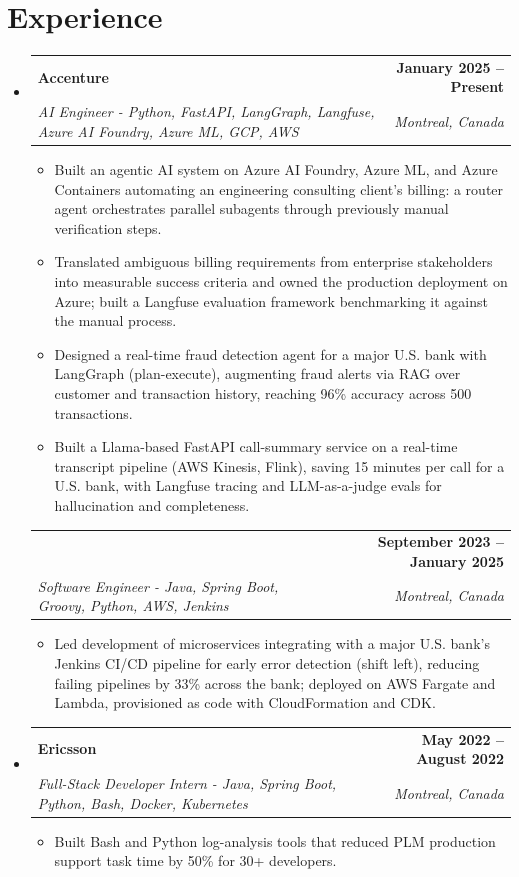 \documentclass[letterpaper,11pt]{article}
\makeatletter
\newcommand{\resumeItem}[1]{
  \item\small{{#1 \vspace{-2pt}}}
}
\newcommand{\resumeSubheading}[4]{
  \vspace{-2pt}\item
    \begin{tabular*}{1.0\textwidth}[t]{l@{\extracolsep{\fill}}r}
      \textbf{#1} & \textbf{\small #2} \\
      \textit{\small#3} & \textit{\small #4} \\
    \end{tabular*}\vspace{-7pt}
}
\newcommand{\resumeSubheadingContinued}[3]{
  \vspace{4pt}
    \begin{tabular*}{1.0\textwidth}[t]{l@{\extracolsep{\fill}}r}
      & \textbf{\small #2} \\
      \textit{\small#1} & \textit{\small #3} \\
    \end{tabular*}\vspace{-7pt}
}
\newcommand{\resumeSubHeadingListStart}{\begin{itemize}[leftmargin=0.0in, label={}]}
\newcommand{\resumeSubHeadingListEnd}{\end{itemize}}
\newcommand{\resumeItemListStart}{\begin{itemize}}
\newcommand{\resumeItemListEnd}{\end{itemize}\vspace{-5pt}}
\makeatother
\begin{document}
\section{Experience}
  \resumeSubHeadingListStart

    \resumeSubheading
      {Accenture}{January 2025 -- Present}
      {AI Engineer - Python, FastAPI, LangGraph, Langfuse, Azure AI Foundry, Azure ML, GCP, AWS}{Montreal, Canada}
      \resumeItemListStart
        \resumeItem{Built an agentic AI system on Azure AI Foundry, Azure ML, and Azure Containers automating an engineering consulting client's billing: a router agent orchestrates parallel subagents through previously manual verification steps.}
        \resumeItem{Translated ambiguous billing requirements from enterprise stakeholders into measurable success criteria and owned the production deployment on Azure; built a Langfuse evaluation framework benchmarking it against the manual process.}
        \resumeItem{Designed a real-time fraud detection agent for a major U.S. bank with LangGraph (plan-execute), augmenting fraud alerts via RAG over customer and transaction history, reaching 96\% accuracy across 500 transactions.}
        \resumeItem{Built a Llama-based FastAPI call-summary service on a real-time transcript pipeline (AWS Kinesis, Flink), saving 15 minutes per call for a U.S. bank, with Langfuse tracing and LLM-as-a-judge evals for hallucination and completeness.}
      \resumeItemListEnd
      \vspace{-8pt}

    \resumeSubheadingContinued
      {Software Engineer - Java, Spring Boot, Groovy, Python, AWS, Jenkins}{September 2023 -- January 2025}{Montreal, Canada}
      \resumeItemListStart
        \resumeItem{Led development of microservices integrating with a major U.S. bank's Jenkins CI/CD pipeline for early error detection (shift left), reducing failing pipelines by 33\% across the bank; deployed on AWS Fargate and Lambda, provisioned as code with CloudFormation and CDK.}
      \resumeItemListEnd

    \resumeSubheading
      {Ericsson}{May 2022 -- August 2022}
      {Full-Stack Developer Intern - Java, Spring Boot, Python, Bash, Docker, Kubernetes}{Montreal, Canada}
      \resumeItemListStart
        \resumeItem{Built Bash and Python log-analysis tools that reduced PLM production support task time by 50\% for 30+ developers.}
      \resumeItemListEnd

  \resumeSubHeadingListEnd
\vspace{-14pt}
\end{document}
